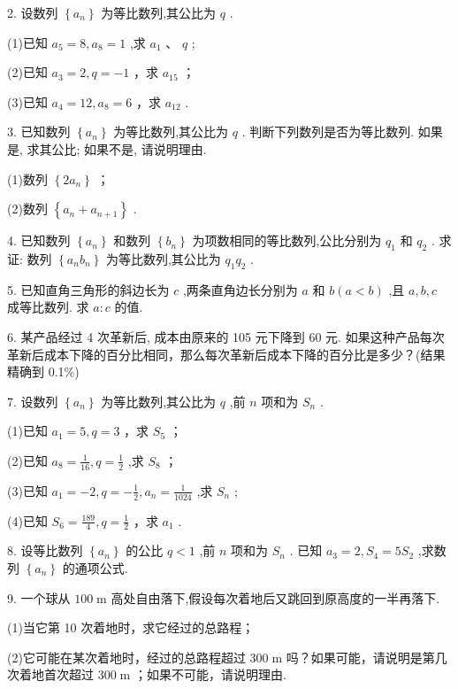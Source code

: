 \documentclass[10pt]{article}
\begin{document}
2. 设数列 \(\left\{  {a}_{n}\right\}\) 为等比数列,其公比为 \(q\) .

(1)已知 \({a}_{5} = 8,{a}_{8} = 1\) ,求 \({a}_{1}\text{ 、 }q\) ;

(2)已知 \({a}_{3} = 2,q =  - 1\) ，求 \({a}_{15}\) ；

(3)已知 \({a}_{4} = {12},{a}_{8} = 6\) ，求 \({a}_{12}\) .

3. 已知数列 \(\left\{  {a}_{n}\right\}\) 为等比数列,其公比为 \(q\) . 判断下列数列是否为等比数列. 如果是, 求其公比; 如果不是, 请说明理由.

(1)数列 \(\left\{  {2{a}_{n}}\right\}\) ；

(2)数列 \(\left\{  {{a}_{n} + {a}_{n + 1}}\right\}\) .

4. 已知数列 \(\left\{  {a}_{n}\right\}\) 和数列 \(\left\{  {b}_{n}\right\}\) 为项数相同的等比数列,公比分别为 \({q}_{1}\) 和 \({q}_{2}\) . 求证: 数列 \(\left\{  {{a}_{n}{b}_{n}}\right\}\) 为等比数列,其公比为 \({q}_{1}{q}_{2}\) .

5. 已知直角三角形的斜边长为 \(c\) ,两条直角边长分别为 \(a\) 和 \(b\left( {a < b}\right)\) ,且 \(a,b,c\) 成等比数列. 求 \(a : c\) 的值.

6. 某产品经过 4 次革新后, 成本由原来的 105 元下降到 60 元. 如果这种产品每次革新后成本下降的百分比相同，那么每次革新后成本下降的百分比是多少？(结果精确到 0.1\%)

7. 设数列 \(\left\{  {a}_{n}\right\}\) 为等比数列,其公比为 \(q\) ,前 \(n\) 项和为 \({S}_{n}\) .

(1)已知 \({a}_{1} = 5,q = 3\) ，求 \({S}_{5}\) ；

(2)已知 \({a}_{8} = \frac{1}{16},q = \frac{1}{2}\) ,求 \({S}_{8}\) ；

(3)已知 \({a}_{1} =  - 2,q =  - \frac{1}{2},{a}_{n} = \frac{1}{1024}\) ,求 \({S}_{n}\) ;

(4)已知 \({S}_{6} = \frac{189}{4},q = \frac{1}{2}\) ，求 \({a}_{1}\) .

8. 设等比数列 \(\left\{  {a}_{n}\right\}\) 的公比 \(q < 1\) ,前 \(n\) 项和为 \({S}_{n}\) . 已知 \({a}_{3} = 2,{S}_{4} = 5{S}_{2}\) ,求数列 \(\left\{  {a}_{n}\right\}\) 的通项公式.

9. 一个球从 \({100}\mathrm{\;m}\) 高处自由落下,假设每次着地后又跳回到原高度的一半再落下.

(1)当它第 10 次着地时，求它经过的总路程；

(2)它可能在某次着地时，经过的总路程超过 \({300}\mathrm{\;m}\) 吗？如果可能，请说明是第几次着地首次超过 \({300}\mathrm{\;m}\) ；如果不可能，请说明理由.
\end{document}
